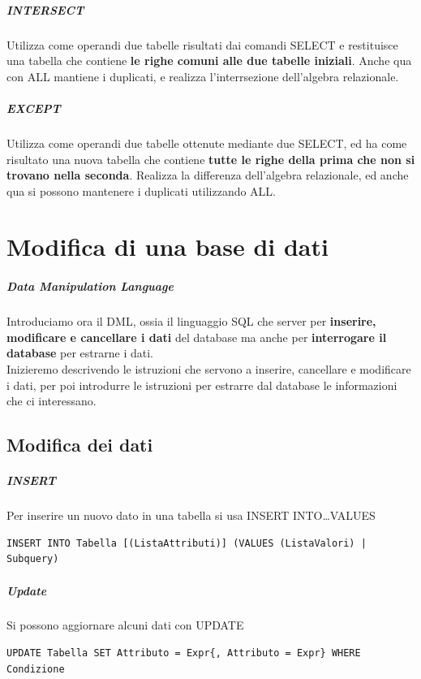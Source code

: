 \documentclass[10pt]{book}
\begin{document}
\paragraph{INTERSECT} Utilizza come operandi due tabelle risultati dai comandi SELECT e restituisce una tabella che contiene \textbf{le righe comuni alle due tabelle iniziali}. Anche qua con ALL mantiene i duplicati, e realizza l'interrsezione dell'algebra relazionale.
\paragraph{EXCEPT} Utilizza come operandi due tabelle ottenute mediante due SELECT, ed ha come risultato una nuova tabella che contiene \textbf{tutte le righe della prima che non si trovano nella seconda}. Realizza la differenza dell'algebra relazionale, ed anche qua si possono mantenere i duplicati utilizzando ALL.
\chapter{Modifica di una base di dati}
\paragraph{Data Manipulation Language} Introduciamo ora il DML, ossia il linguaggio SQL che server per \textbf{inserire, modificare e cancellare i dati} del database ma anche per \textbf{interrogare il database} per estrarne i dati.\\
Inizieremo descrivendo le istruzioni che servono a inserire, cancellare e modificare i dati, per poi introdurre le istruzioni per estrarre dal database le informazioni che ci interessano.
\section{Modifica dei dati}
\paragraph{INSERT} Per inserire un nuovo dato in una tabella si usa INSERT INTO\ldots VALUES
\begin{lstlisting}
INSERT INTO Tabella [(ListaAttributi)] (VALUES (ListaValori) | Subquery)
\end{lstlisting}
\paragraph{Update} Si possono aggiornare alcuni dati con UPDATE
\begin{lstlisting}
UPDATE Tabella SET Attributo = Expr{, Attributo = Expr} WHERE Condizione
\end{lstlisting}
\end{document}
